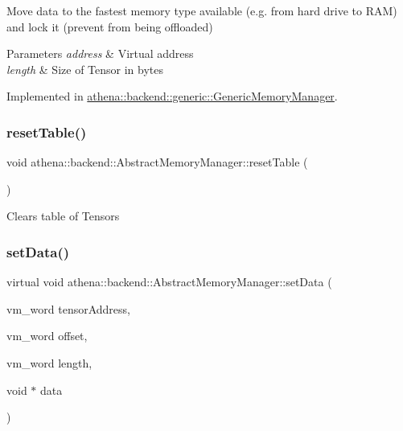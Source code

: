 Move data to the fastest memory type available (e.\+g. from hard drive to R\+AM) and lock it (prevent from being offloaded) 
\begin{DoxyParams}{Parameters}
{\em address} & Virtual address \\
\hline
{\em length} & Size of Tensor in bytes \\
\hline
\end{DoxyParams}


Implemented in \mbox{\hyperlink{classathena_1_1backend_1_1generic_1_1_generic_memory_manager_aa7fce5a6cbd9c4f5ad1868735e4546a8}{athena\+::backend\+::generic\+::\+Generic\+Memory\+Manager}}.

\mbox{\label{classathena_1_1backend_1_1_abstract_memory_manager_a358f614d4358f5dce28f17dba6917b1f}} 
\subsubsection{\texorpdfstring{reset\+Table()}{resetTable()}}
{\footnotesize\ttfamily void athena\+::backend\+::\+Abstract\+Memory\+Manager\+::reset\+Table (\begin{DoxyParamCaption}{ }\end{DoxyParamCaption})}

Clears table of Tensors \mbox{\label{classathena_1_1backend_1_1_abstract_memory_manager_a18562c6f336ff0f7ff800f877696c851}} 
\subsubsection{\texorpdfstring{set\+Data()}{setData()}}
{\footnotesize\ttfamily virtual void athena\+::backend\+::\+Abstract\+Memory\+Manager\+::set\+Data (\begin{DoxyParamCaption}\item[{vm\+\_\+word}]{tensor\+Address,  }\item[{vm\+\_\+word}]{offset,  }\item[{vm\+\_\+word}]{length,  }\item[{void $\ast$}]{data }\end{DoxyParamCaption})\hspace{0.3cm}{\ttfamily [pure virtual]}}

